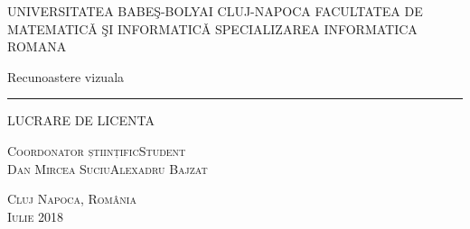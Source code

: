 \begin{titlepage}
	\begin{center}
		\vspace{0.5cm}
		\Large \textsc{UNIVERSITATEA BABEŞ-BOLYAI CLUJ-NAPOCA FACULTATEA DE MATEMATICǍ ŞI INFORMATICǍ 
		SPECIALIZAREA INFORMATICA ROMANA }

		\vfill

		\Huge Recunoastere vizuala
		\rule{\textwidth}{1pt}
		\Large LUCRARE DE LICENTA

		\vfill

		\Large
		\textsc{Coordonator științific}\hfill \textsc{Student}
		\\
		\large
		\textsc{Dan Mircea Suciu}\hfill \textsc{Alexadru Bajzat}
	
		\vspace{1.5cm}
		\textsc{Cluj Napoca, România}\\
		\textsc{Iulie 2018}

	\end{center}
\end{titlepage}
 
